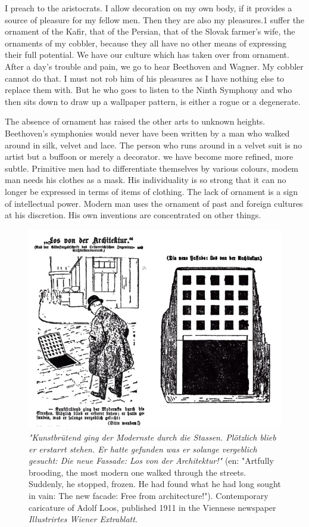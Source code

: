 \documentclass[a4paper]{article}
\begin{document}
I preach to the aristocrats. I allow decoration on my own body, if it provides a source of pleasure for my fellow men. Then they are also my pleasures.1 suffer the ornament of the Kafir, that of the Persian, that of the Slovak farmer’s wife, the ornaments of my cobbler, because they all have no other means of expressing their full potential. We have our culture which has taken over from ornament. After a day’s trouble and pain, we go to hear Beethoven and Wagner. My cobbler cannot do that. I must not rob him of his pleasures as I have nothing else to replace them with. But he who goes to listen to the Ninth Symphony and who then sits down to draw up a wallpaper pattern, is either a rogue or a degenerate.

The absence of ornament has raised the other arts to unknown heights. Beethoven’s symphonies would never have been written by a man who walked around in silk, velvet and lace. The person who runs around in a velvet suit is no artist but a buffoon or merely a decorator. we have become more refined, more subtle. Primitive men had to differentiate themselves by various colours, modem man needs his clothes as a mask. His individuality is so strong that it can no longer be expressed in terms of items of clothing. The lack of ornament is a sign of intellectual power. Modern man uses the ornament of past and foreign cultures at his discretion. His own inventions are concentrated on other things.

\begin{figure}[h]
  \centering
  \includegraphics[width=0.7\linewidth]{./figures/caricature_loos.jpg}
  \caption{\textit{"Kunstbrütend ging der Modernste durch die Stassen. Plötzlich blieb er erstarrt stehen. Er hatte gefunden was er solange vergeblich gesucht: Die neue Fassade: Los von der Architektur!"} (en: "Artfully brooding, the most modern one walked through the streets. Suddenly, he stopped, frozen. He had found what he had long sought in vain: The new facade: Free from architecture!"). Contemporary caricature of Adolf Loos, published 1911 in the Viennese newspaper \textit{Illustrirtes Wiener Extrablatt}.}
  \label{fig:caricature_loos}
\end{figure}
\end{document}
